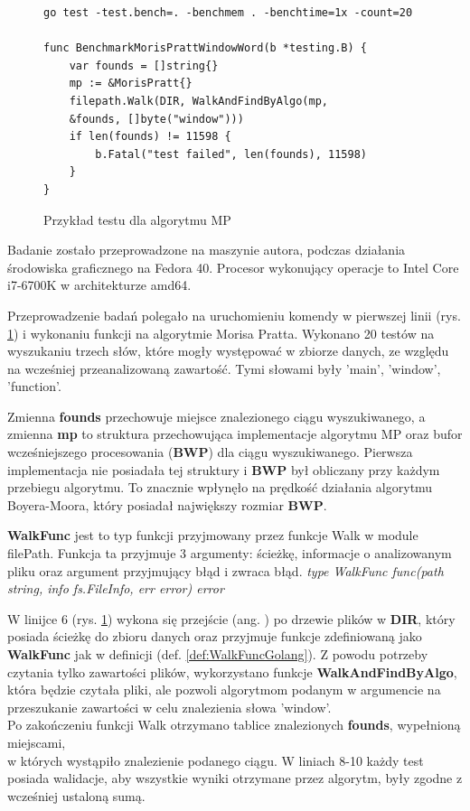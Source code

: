 \begin{figure}[htbp]
  \centering
  \begin{lstlisting}
go test -test.bench=. -benchmem . -benchtime=1x -count=20

func BenchmarkMorisPrattWindowWord(b *testing.B) {
	var founds = []string{}
	mp := &MorisPratt{}
	filepath.Walk(DIR, WalkAndFindByAlgo(mp,
    &founds, []byte("window")))
	if len(founds) != 11598 {
		b.Fatal("test failed", len(founds), 11598)
	}
}
  \end{lstlisting}
  \caption{Przykład testu dla algorytmu MP}
  \label{fig:code:examplePerfTest}
\end{figure}
Badanie zostało przeprowadzone na maszynie autora, podczas działania środowiska
graficznego na Fedora 40. Procesor wykonujący operacje to Intel Core i7-6700K
w architekturze amd64.

Przeprowadzenie badań polegało na uruchomieniu komendy w pierwszej linii (rys. 
\ref{fig:code:examplePerfTest}) i wykonaniu funkcji na algorytmie Morisa Pratta. 
Wykonano 20 testów na wyszukaniu trzech słów, które mogły występować w zbiorze danych,
ze względu na wcześniej przeanalizowaną zawartość. Tymi słowami były 
'main', 'window', 'function'.

Zmienna \textbf{founds} przechowuje miejsce znalezionego 
ciągu wyszukiwanego, a zmienna \textbf{mp} to struktura przechowująca implementacje algorytmu MP oraz
bufor wcześniejszego procesowania (\textbf{BWP}) dla ciągu wyszukiwanego. Pierwsza implementacja nie 
posiadała tej struktury i \textbf{BWP} był obliczany przy każdym przebiegu algorytmu.
To znacznie wpłynęło na prędkość działania algorytmu Boyera-Moora, który 
posiadał największy rozmiar \textbf{BWP}.

\begin{Definition}\label{def:WalkFuncGolang}
\textbf{WalkFunc} jest to typ funkcji przyjmowany przez funkcje Walk w module filePath.
Funkcja ta przyjmuje 3 argumenty: ścieżkę, informacje o analizowanym pliku oraz
argument przyjmujący błąd i zwraca błąd. \newline \newline
\textit{type WalkFunc func(path string, info fs.FileInfo, err error) error}
\end{Definition}

W linijce 6 (rys. \ref{fig:code:examplePerfTest}) wykona się przejście (ang. 
) po drzewie plików w \textbf{DIR}, który posiada ścieżkę do 
zbioru danych oraz przyjmuje funkcje zdefiniowaną jako \textbf{WalkFunc} jak w definicji
(def. \ref{def:WalkFuncGolang}). Z powodu potrzeby czytania tylko zawartości plików,
wykorzystano funkcje \textbf{WalkAndFindByAlgo}, która będzie czytała pliki, ale 
pozwoli algorytmom podanym w argumencie na przeszukanie zawartości w celu 
znalezienia słowa 'window'. \\ Po zakończeniu funkcji Walk otrzymano 
tablice znalezionych \textbf{founds}, wypełnioną miejscami, \\ w których wystąpiło 
znalezienie podanego ciągu. W liniach 8-10 każdy test posiada walidacje, aby wszystkie wyniki 
otrzymane przez algorytm, były zgodne z wcześniej ustaloną sumą.

